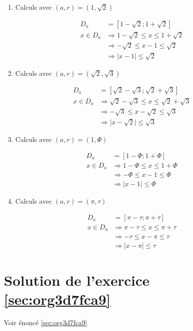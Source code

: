 \documentclass[a4paper, 11pt, twoside]{book}
\begin{document}
\begin{enumerate}
\item Calculs avec \((a, r) = (1, \sqrt{2})\)

\begin{align*}
D_a &= [1-\sqrt{2} ; 1+\sqrt{2}]\\
x\in D_a &\Rightarrow 1-\sqrt{2}\leq x\leq 1+\sqrt{2}\\
&\Rightarrow -\sqrt{2}\leq x - 1\leq \sqrt{2}\\
&\Rightarrow \lvert x - 1\rvert \leq \sqrt{2}
\end{align*}
\item Calculs avec \((a, r) = (\sqrt{2}, \sqrt{3})\)

\begin{align*}
D_a &= [\sqrt{2}-\sqrt{3} ; \sqrt{2}+\sqrt{3}]\\
x\in D_a &\Rightarrow \sqrt{2}-\sqrt{3}\leq x\leq \sqrt{2}+\sqrt{3}\\
&\Rightarrow -\sqrt{3}\leq x - \sqrt{2}\leq \sqrt{3}\\
&\Rightarrow \lvert x - \sqrt{2}\rvert \leq \sqrt{3}
\end{align*}
\item Calculs avec \((a, r) = (1, \Phi)\)

\begin{align*}
D_a &= [1-\Phi ; 1+\Phi]\\
x\in D_a &\Rightarrow 1-\Phi\leq x\leq 1+\Phi\\
&\Rightarrow -\Phi\leq x - 1\leq \Phi\\
&\Rightarrow \lvert x - 1\rvert \leq \Phi
\end{align*}
\item Calculs avec \((a, r) = (\pi, \tau)\)

\begin{align*}
D_a &= [\pi-\tau ; \pi+\tau]\\
x\in D_a &\Rightarrow \pi-\tau\leq x\leq \pi+\tau\\
&\Rightarrow -\tau\leq x - \pi\leq \tau\\
&\Rightarrow \lvert x - \pi\rvert \leq \tau
\end{align*}
\end{enumerate}
\section{Solution de l'exercice \ref{sec:org3d7fca9}}
\label{sec:org61b844d}
Voir énoncé \ref{sec:org3d7fca9}
\end{document}
